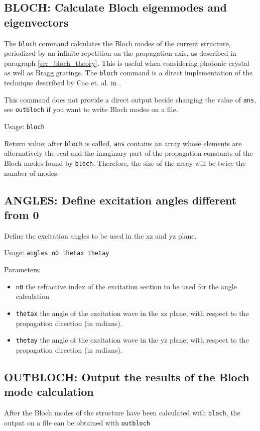 \subsection{BLOCH: Calculate Bloch eigenmodes and eigenvectors}
\label{subsec_bloch}
The \lstinline!bloch! command calculates the Bloch modes of the current structure, periodized by an infinite repetition on the propagation axis, as described in paragraph \ref{sec_bloch_theory}. This is useful when considering photonic crystal as well as Bragg gratings. The \lstinline!bloch! command is a direct implementation of the technique described by Cao et. al. in \cite{cao2002stable}.

This command does not provide a direct output beside changing the value of \lstinline!ans!, see \lstinline!outbloch! if you want to write Bloch modes on a file.
    
Usage: \lstinline!bloch!

Return value: after \lstinline!bloch! is called, \lstinline!ans! contains an array whose elements are alternatively the real and the imaginary part of the propagation constants of the Bloch modes found by \lstinline!bloch!. Therefore, the size of the array will be twice the number of modes.

\subsection{ANGLES: Define excitation angles different from 0}
\label{subsec_angles}
Define the excitation angles to be used in the xz and yz plane.

Usage: \lstinline!angles n0 thetax thetay!

Parameters:
\begin{itemize}
\item \lstinline!n0! the refractive index of the excitation section to be used for the angle calculation
\item \lstinline!thetax! the angle of the excitation wave in the xz plane, with respect to the propagation direction (in radians).
\item \lstinline!thetay! the angle of the excitation wave in the yz plane, with respect to the propagation direction (in radians).
\end{itemize}

\subsection{OUTBLOCH: Output the results of the Bloch mode calculation}
After the Bloch modes of the structure have been calculated with \lstinline!bloch!, the output on a file can be obtained with \lstinline!outbloch!


